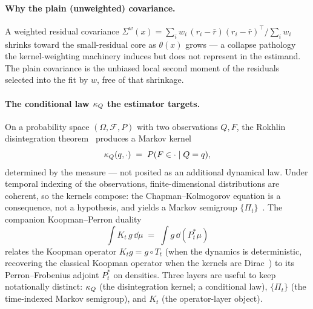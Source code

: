 \paragraph{Why the plain (unweighted) covariance.}
A weighted residual covariance \(\Sigma^{w}(x) = \sum_i w_i\,
(r_i - \bar r)(r_i - \bar r)^{\!\top} / \sum_i w_i\) shrinks toward
the small-residual core as \(\theta(x)\) grows --- a collapse
pathology the kernel-weighting machinery induces but does not
represent in the estimand. The plain covariance is the unbiased local
second moment of the residuals selected into the fit by \(w\), free
of that shrinkage.

\paragraph{The conditional law \(\kappa_{Q}\) the estimator targets.}
On a probability space \((\Omega, \mathcal{F}, P)\) with two
observations \(Q, F\), the Rokhlin disintegration
theorem~\cite{Rokhlin1952,Bogachev2007} produces a Markov kernel
\begin{equation}
\label{eq:kappaQ}
\kappa_{Q}(q, \cdot) \;=\; P(F \in \cdot \mid Q = q),
\end{equation}
determined by the measure --- not posited as an additional dynamical
law. Under temporal indexing of the observations, finite-dimensional
distributions are coherent, so the kernels compose: the
Chapman--Kolmogorov equation is a consequence, not a hypothesis, and
yields a Markov semigroup \(\{\Pi_t\}\)~\cite{Eisner2015}. The
companion Koopman--Perron duality
\begin{equation}
\label{eq:KP}
\int K_t\, g\, \dd\mu \;=\; \int g\, \dd(P_t^{*}\mu)
\end{equation}
relates the Koopman operator \(K_t g = g \circ T_t\) (when the
dynamics is deterministic, recovering the classical Koopman operator
when the kernels are Dirac~\cite{LasotaMackey1994}) to its
Perron--Frobenius adjoint \(P_t^{*}\) on densities. Three layers are
useful to keep notationally distinct: \(\kappa_{Q}\) (the disintegration
kernel; a conditional law), \(\{\Pi_t\}\) (the time-indexed Markov
semigroup), and \(K_t\) (the operator-layer object).

